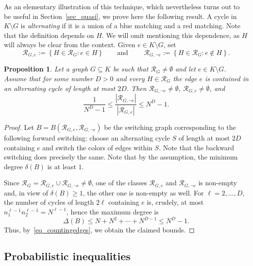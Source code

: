 \documentclass[12pt,reqno]{amsart}
\newcommand{\rc}{{\mathcal{R}}}
\newtheorem{proposition}[theorem]{Proposition}
\theoremstyle{definition}
\begin{document}
As an elementary illustration of this technique, which nevertheless turns out to be useful in Section~\ref{sec_quasi}, we prove here the following result. A cycle in $K\setminus G$ is \emph{alternating} if it is a union of a blue matching and a red matching. Note that the definition depends on $H$. We will omit mentioning this dependence, as $H$ will always be clear from the context.
 Given $e \in K\setminus G$, set
\begin{equation}
  \label{eq_rcGe}
	\rc_{G,e} := \left\{ H \in \rc_G : e \in H \right\}\qquad\text{and }\qquad \rc_{G,\neg e} := \left\{ H \in \rc_G : e \not\in H \right\}.
\end{equation}

\begin{proposition}
  \label{prop_switch}
  Let a graph $G\subseteq K$ be such that $\rc_G\neq\emptyset$ and let $e\in K\setminus G$. Assume that for some number $D > 0$ and every $H\in \rc_{G}$ the edge $e$ is contained in an alternating cycle of length at most $2D$. Then $\rc_{G,\neg e}\neq\emptyset$, $\rc_{G, e}\neq\emptyset$, and
	\[
		\frac{1}{N^D - 1} \le \frac{|\rc_{G,\neg e}|}{|\rc_{G,e}|} \le N^D - 1.
	\]
\end{proposition}

\begin{proof}
  Let $B = B(\rc_{G,e}, \rc_{G,\neg e})$ be the switching graph corresponding to the following forward switching: choose an alternating cycle $S$ of length at most $2D$ containing $e$ and switch the colors of edges within $S$. Note that the backward switching does precisely the same.
Note that by  the assumption, the minimum degree $\delta(B)$ is at least $1$.

Since  $\rc_G=\rc_{G, e}\cup\rc_{G, \neg e} \neq \emptyset$, one of the classes $\rc_{G, e}$ and $\rc_{G, \neg e}$ is non-empty and, in view of $\delta(B) \ge 1$, the other one is non-empty as well. For $\ell = 2, \dots, D$, the number of cycles of length $2\ell$ containing $e$ is, crudely, at most $n_1^{\ell - 1} n_2^{\ell - 1} = N^{\ell - 1}$, hence the maximum degree is
	\[
		\Delta(B)\le N + N^2 + \cdots + N^{D - 1} \le N^D - 1.
	\]
Thus, by~\eqref{eq_countingedges}, we obtain
 the claimed bounds. \end{proof}



\subsection{Probabilistic inequalities}
\label{ss_probineq}
\end{document}

